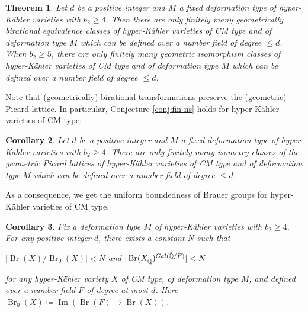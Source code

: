 \documentclass[11pt,reqno,oneside]{amsart}
\numberwithin{equation}{section}
\newtheorem{theorem}{Theorem}[section]
\newtheorem{corollary}[theorem]{Corollary}
\theoremstyle{definition}
\DeclareMathOperator{\Br}{Br}
\newcommand{\Gal}{{\rm Gal}}
\newcommand{\QQ}{\mathbb{Q}}
\begin{document}
\begin{theorem}\label{mainthm3}
Let $d$ be a positive integer and $M$ a fixed deformation type of hyper-Kähler varieties with $b_2 \geq 4$. Then there are only finitely many geometrically birational equivalence classes of hyper-Kähler varieties of CM type and of deformation type $M$ which can be defined over a number field of degree $\leq d$.
When $b_2\geq 5$, there are only finitely many geometric isomorphism classes of hyper-Kähler varieties of CM type and of deformation type $M$ which can be defined over a number field of degree $\leq d$.
\end{theorem}
Note that (geometrically) birational transformations preserve the (geometric) Picard lattice. In particular, Conjecture \ref{conj:fin-ns} holds for hyper-Kähler varieties of CM type:

\begin{corollary}
\label{cor:FinitenessPicard}
Let $d$ be a positive integer and $M$ a fixed deformation type of hyper-Kähler varieties with $b_2 \geq 4$. There are only finitely many  
isometry classes of the geometric Picard lattices of hyper-Kähler varieties of CM type and of deformation type $M$ which can be defined over a number field of degree $\leq d$.
\end{corollary}


As a consequence, we get the uniform boundedness of Brauer groups for hyper-Kähler varieties of CM type. 

\begin{corollary}\label{CorBr}
Fix a deformation type $M$ of hyper-Kähler varieties with $b_2 \geq 4$.
For any positive integer $d$,  there exists a constant $N$ such that
\begin{center}
    $|\Br(X)/\Br_0(X)| < N$ and $|\Br(X_{\bar{\QQ}})^{\Gal(\bar{\QQ}/F)}| < N$
\end{center}
for any hyper-Kähler variety $X$ of CM type, of deformation type $M$, and defined over a number field $F$ of degree at most $d$. Here $\Br_0(X)\coloneqq \operatorname{Im}\left(\Br(F)\to \Br(X)\right)$.
\end{corollary}
\end{document}
